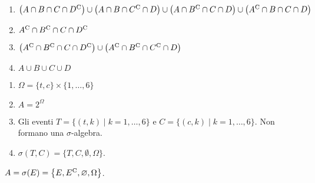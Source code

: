 \Soluzione

\begin{enumerate}
	\item $\left(A\cap B\cap C\cap D^{\mathrm{C}}\right) \cup \left(A\cap B\cap C^{\mathrm{C}} \cap D\right) \cup \left(A\cap B^{\mathrm{C}} \cap C\cap D\right) \cup \left(A^{\mathrm{C}} \cap B\cap C\cap D\right)$
	\item $A^{\mathrm{C}} \cap B^{\mathrm{C}} \cap C\cap D^{\mathrm{C}}$
	\item $\left(A^{\mathrm{C}} \cap B^{\mathrm{C}} \cap C\cap D^{\mathrm{C}}\right) \cup \left(A^{\mathrm{C}} \cap B^{\mathrm{C}} \cap C^{\mathrm{C}} \cap D\right)$
	\item $A\cup B\cup C\cup D$
\end{enumerate}

\Soluzione

\begin{enumerate}
	\item $\Omega =\{t,c\} \times \{1,\dots ,6\}$
	\item $A=2^{\Omega }$
	\item Gli eventi $T=\{(t,k) \mid k=1,\dots ,6\}$ e $C=\{(c,k) \mid k=1,\dots ,6\}$. Non formano una $\sigma $-algebra.
	\item $\sigma (T,C) =\{T,C,\emptyset ,\Omega \}$.
\end{enumerate}

\Soluzione

$A=\sigma (E) =\left\{E,E^{\mathrm{C}} ,\varnothing ,\Omega \right\}$.

\Soluzione

